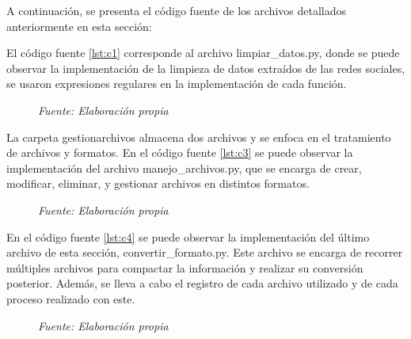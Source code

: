 A continuación, se presenta el código fuente de los archivos detallados anteriormente en esta sección:



El código fuente \ref{lst:c1} corresponde al archivo limpiar\_datos.py, donde se puede observar la implementación de la limpieza de datos extraídos de las redes sociales, se usaron expresiones regulares en la implementación de cada función. 



\vspace{-1.3em} %

\begin{figure}[h!]
	\centering %
	\textit{Fuente: Elaboración propia}
\end{figure}






La carpeta gestionarchivos almacena dos archivos y se enfoca en el tratamiento de archivos y formatos. En el código fuente \ref{lst:c3} se puede observar la implementación del archivo manejo\_archivos.py, que se encarga de crear, modificar, eliminar, y gestionar archivos en distintos formatos.


\vspace{-1.3em} %

\begin{figure}[h!]
	\centering %
	\textit{Fuente: Elaboración propia}
\end{figure}

En el código fuente \ref{lst:c4} se puede observar la implementación del último archivo de esta sección, convertir\_formato.py. Este archivo se encarga de recorrer múltiples archivos para compactar la información y realizar su conversión posterior. Además, se lleva a cabo el registro de cada archivo utilizado y de cada proceso realizado con este.


\vspace{-1.3em} %

\begin{figure}[h!]
	\centering %
	\textit{Fuente: Elaboración propia}
\end{figure}